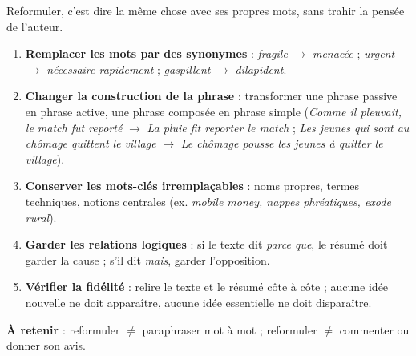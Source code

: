 \documentclass[11pt]{article}
\begin{document}
\begin{methode}
Reformuler, c'est dire la même chose avec ses propres mots, sans trahir la pensée de l'auteur.
\begin{enumerate}
\item \textbf{Remplacer les mots par des synonymes} : \emph{fragile} $\rightarrow$ \emph{menacée} ; \emph{urgent} $\rightarrow$ \emph{nécessaire rapidement} ; \emph{gaspillent} $\rightarrow$ \emph{dilapident}.
\item \textbf{Changer la construction de la phrase} : transformer une phrase passive en phrase active, une phrase composée en phrase simple (\emph{Comme il pleuvait, le match fut reporté} $\rightarrow$ \emph{La pluie fit reporter le match} ; \emph{Les jeunes qui sont au chômage quittent le village} $\rightarrow$ \emph{Le chômage pousse les jeunes à quitter le village}).
\item \textbf{Conserver les mots-clés irremplaçables} : noms propres, termes techniques, notions centrales (ex. \emph{mobile money, nappes phréatiques, exode rural}).
\item \textbf{Garder les relations logiques} : si le texte dit \emph{parce que}, le résumé doit garder la cause ; s'il dit \emph{mais}, garder l'opposition.
\item \textbf{Vérifier la fidélité} : relire le texte et le résumé côte à côte ; aucune idée nouvelle ne doit apparaître, aucune idée essentielle ne doit disparaître.
\end{enumerate}
\textbf{À retenir} : reformuler $\neq$ paraphraser mot à mot ; reformuler $\neq$ commenter ou donner son avis.
\end{methode}
\end{document}
